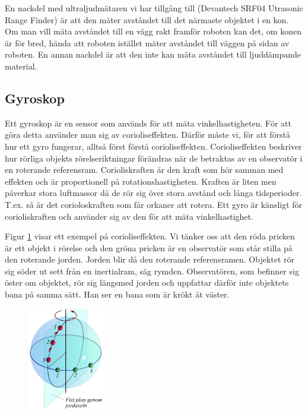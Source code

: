 \documentclass[a4paper,12pt,fleqn]{article}
\begin{document}
En nackdel med ultraljudmätaren vi har tillgång till (Devantech SRF04 Utrasonic Range Finder) är att den mäter avståndet till det närmaste objektet i en kon. Om man vill mäta avståndet till en vägg rakt framför roboten kan det, om konen är för bred, hända att roboten istället mäter avståndet till väggen på sidan av roboten. En annan nackdel är att den inte kan mäta avståndet till ljuddämpande material.



\subsection{Gyroskop}
Ett gyroskop är en sensor som används för att mäta vinkelhastigheten. För att göra detta använder man sig av corioliseffekten. Därför måste vi, för att förstå hur ett gyro fungerar, alltså först förstå corioliseffekten. Corioliseffekten beskriver hur rörliga objekts rörelseriktningar förändras när de betraktas av en observatör i en roterande referensram. Corioliskraften är den kraft som hör samman med effekten och är proportionell på rotationshastigheten. Kraften är liten men påverkar stora luftmassor då de rör sig över stora avstånd och långa tidsperioder. T.ex. så är det corioloskraften som får orkaner att rotera. Ett gyro är känsligt för corioliskraften och använder sig av den för att mäta vinkelhastighet.

Figur \ref{fig:jord} visar ett exempel på corioliseffekten. Vi tänker oss att den röda pricken är ett objekt i rörelse och den gröna pricken är en observatör som står stilla på den roterande jorden. Jorden blir då den roterande referensramen. Objektet rör sig söder ut sett från en inertialram, säg rymden. Observatören, som befinner sig öster om objektet, rör sig längsmed jorden och uppfattar därför inte objektets bana på samma sätt. Han ser en bana som är krökt åt väster.
\begin{figure}[h]
\label{fig:jord}
\caption{}
\includegraphics[width=0.3\textwidth]
{Coriolisjord.png}
\end{figure}
\end{document}
